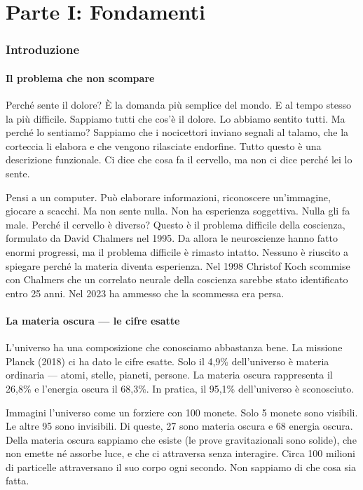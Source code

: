 \documentclass[11pt,a4paper]{article}
\begin{document}
\newpage
\part*{Parte I: Fondamenti}
\section{Introduzione}

\subsection{Il problema che non scompare}
Perché sente il dolore? È la domanda più semplice del mondo. E al tempo stesso la più difficile. Sappiamo tutti che cos'è il dolore. Lo abbiamo sentito tutti. Ma perché lo sentiamo? Sappiamo che i nocicettori inviano segnali al talamo, che la corteccia li elabora e che vengono rilasciate endorfine. Tutto questo è una descrizione funzionale. Ci dice che cosa fa il cervello, ma non ci dice perché lei lo sente.

Pensi a un computer. Può elaborare informazioni, riconoscere un'immagine, giocare a scacchi. Ma non sente nulla. Non ha esperienza soggettiva. Nulla gli fa male. Perché il cervello è diverso? Questo è il problema difficile della coscienza, formulato da David Chalmers nel 1995. Da allora le neuroscienze hanno fatto enormi progressi, ma il problema difficile è rimasto intatto. Nessuno è riuscito a spiegare perché la materia diventa esperienza. Nel 1998 Christof Koch scommise con Chalmers che un correlato neurale della coscienza sarebbe stato identificato entro 25 anni. Nel 2023 ha ammesso che la scommessa era persa.

\subsection{La materia oscura --- le cifre esatte}
L'universo ha una composizione che conosciamo abbastanza bene. La missione Planck (2018) ci ha dato le cifre esatte. Solo il 4,9\% dell'universo è materia ordinaria --- atomi, stelle, pianeti, persone. La materia oscura rappresenta il 26,8\% e l'energia oscura il 68,3\%. In pratica, il 95,1\% dell'universo è sconosciuto.

Immagini l'universo come un forziere con 100 monete. Solo 5 monete sono visibili. Le altre 95 sono invisibili. Di queste, 27 sono materia oscura e 68 energia oscura. Della materia oscura sappiamo che esiste (le prove gravitazionali sono solide), che non emette né assorbe luce, e che ci attraversa senza interagire. Circa 100 milioni di particelle attraversano il suo corpo ogni secondo. Non sappiamo di che cosa sia fatta.
\end{document}
